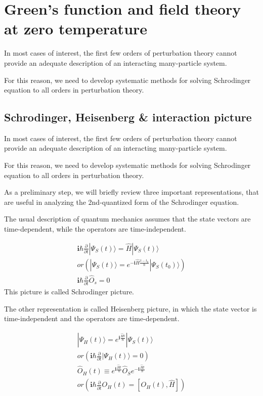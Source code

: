 \chapter{Green's function and field theory at zero temperature}
In most cases of interest, the first few orders of perturbation theory cannot provide an adequate description of an interacting many-particle system.

 For this reason, we need to develop systematic methods for solving Schrodinger equation to all orders in perturbation theory.

\section{Schrodinger, Heisenberg \& interaction picture}

In most cases of interest, the first few orders of perturbation theory cannot provide an adequate description of an interacting many-particle system.

 For this reason, we need to develop systematic methods for solving Schrodinger equation to all orders in perturbation theory.


As a preliminary step, we will briefly review three important representations, that are useful in analyzing the 2nd-quantized form of the Schrodinger equation.

 The usual description of quantum mechanics assumes that the state vectors are time-dependent, while the operators are time-independent.

\begin{align}
\bm{i} \hbar \frac{\partial}{\partial t} | \Psi_S(t)\rangle=\hat{H}| \Psi_S(t)\rangle \nonumber \\
or\left(| \Psi_S(t)\rangle=e^{-\bm{i}\hat H \frac{t-t_0}{\hbar}}|\Psi_S(t_0)\rangle\right) \nonumber \\
\bm{i} \hbar \frac{\partial}{\partial t} \hat O_s = 0 \nonumber
\end{align}
 This picture is called Schrodinger picture.

 The other representation is called Heisenberg picture, in which the state vector is time-independent and the operators are time-dependent.

\begin{align}
| \Psi_H(t)\rangle=e^{\bm{i}  \frac{\hat Ht}{\hbar}}| \Psi_S(t)\rangle  \\
or\left( \bm{i} \hbar \frac{\partial}{\partial t}| \Psi_H(t)\rangle=0\right) \nonumber \\
\hat O_H(t) \equiv e^{\bm{i}  \frac{\hat Ht}{\hbar}}\hat O_S e^{-\bm{i}  \frac{\hat Ht}{\hbar}} \\
or \left( \bm{i} \hbar \frac{\partial}{\partial t}  O_H(t)=[ O_H(t), \hat H] \right)\nonumber
\end{align}

